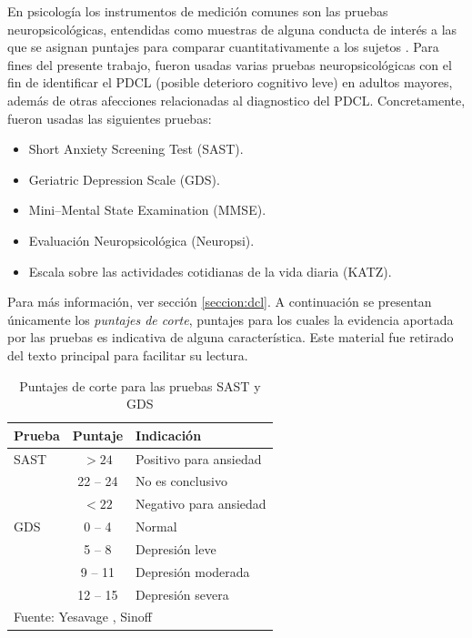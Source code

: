 \documentclass[12pt,letterpaper]{book}
\begin{document}
En psicología los instrumentos de medición comunes son las pruebas neuropsicológicas, entendidas como muestras de alguna conducta de interés a las que se asignan puntajes para comparar cuantitativamente a los sujetos \cite{Ardila12}. 
%
Para fines del presente trabajo, fueron usadas varias pruebas neuropsicológicas con el fin de identificar el PDCL (posible deterioro cognitivo leve) en adultos mayores, además de otras afecciones relacionadas al diagnostico del PDCL.
%
Concretamente, fueron usadas las siguientes pruebas:
\begin{itemize}
\item {Short Anxiety Screening Test (SAST)}. 
\item {Geriatric Depression Scale (GDS)}.
\item {Mini--Mental State Examination (MMSE)}.
\item {Evaluación Neuropsicológica (Neuropsi)}.
\item {Escala sobre las actividades cotidianas de la vida diaria (KATZ)}.
\end{itemize}

Para más información, ver sección \ref{seccion:dcl}.
%
A continuación se presentan únicamente los \textit{puntajes de corte}, puntajes para los cuales la evidencia aportada por las pruebas es indicativa de alguna característica.
%
Este material fue retirado del texto principal para facilitar su lectura.

\begin{table}
\centering
\caption{Puntajes de corte para las pruebas SAST y GDS}
\begin{tabular}{lcl}
\toprule
Prueba & Puntaje & Indicación \\
\midrule
SAST
& $>24$ & Positivo para ansiedad \\
& 22 -- 24 & No es conclusivo \\
& $<22$ & Negativo para ansiedad \\
\midrule
GDS
& 0 -- 4 & Normal \\
& 5 -- 8 & Depresión leve \\
& 9 -- 11 & Depresión moderada \\
& 12 -- 15 & Depresión severa \\
\bottomrule
\multicolumn{3}{l}{Fuente: Yesavage \cite{Yesavage82}, Sinoff \cite{sinoff99} }
\end{tabular}
\label{anexo:sast_gds}
\end{table}
\end{document}
